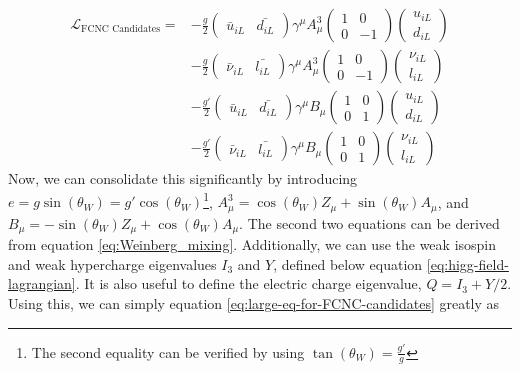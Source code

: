 \begin{equation}
\begin{split}
\mathcal{L}_{\text{FCNC Candidates}} = &-\frac{g}{2}\begin{pmatrix}
\bar{u}_{iL} & \bar{d_{iL}}
\end{pmatrix} \gamma^\mu A_{\mu}^3 \begin{pmatrix}
1 & 0 \\ 0 & -1
\end{pmatrix} \begin{pmatrix}
u_{iL} \\ d_{iL}
\end{pmatrix} \\
&-\frac{g}{2}\begin{pmatrix}
\bar{\nu}_{iL} & \bar{l_{iL}}
\end{pmatrix} \gamma^\mu A_{\mu}^3 \begin{pmatrix}
1 & 0 \\ 0 & -1
\end{pmatrix} \begin{pmatrix}
\nu_{iL} \\ l_{iL}
\end{pmatrix} \\
&-\frac{g'}{2}\begin{pmatrix}
\bar{u}_{iL} & \bar{d_{iL}}
\end{pmatrix} \gamma^\mu B_{\mu} \begin{pmatrix}
1 & 0 \\ 0 & 1
\end{pmatrix} \begin{pmatrix}
u_{iL} \\ d_{iL}
\end{pmatrix} \\
&-\frac{g'}{2}\begin{pmatrix}
\bar{\nu}_{iL} & \bar{l_{iL}}
\end{pmatrix} \gamma^\mu B_{\mu} \begin{pmatrix}
1 & 0 \\ 0 & 1
\end{pmatrix} \begin{pmatrix}
\nu_{iL} \\ l_{iL}
\end{pmatrix}
\label{eq:large-eq-for-FCNC-candidates}
\end{split}
\end{equation}
Now, we can consolidate this significantly by introducing $e = g\sin(\theta_W) = g'\cos(\theta_W)$\footnote{The second equality can be verified by using $\tan(\theta_W) = \frac{g'}{g}$}, $A^3_\mu = \cos(\theta_W)Z_\mu + \sin(\theta_W)A_\mu$, and $B_\mu = -\sin(\theta_W)Z_\mu + \cos(\theta_W) A_\mu$. The second two equations can be derived from equation \ref{eq:Weinberg_mixing}. Additionally, we can use the weak isospin and weak hypercharge eigenvalues $I_3$ and $Y$, defined below equation \ref{eq:higg-field-lagrangian}.  It is also useful to define the electric charge eigenvalue, $Q = I_3 + Y/2$. Using this, we can simply equation \ref{eq:large-eq-for-FCNC-candidates} greatly as
